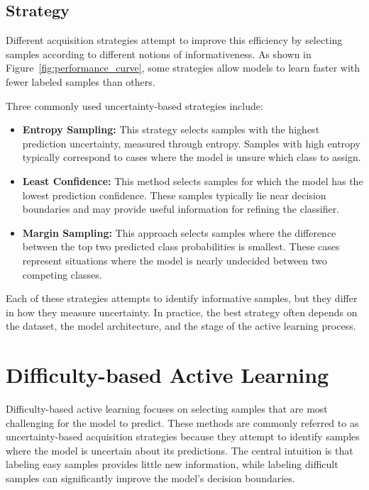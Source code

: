 \documentclass{article}
\begin{document}
\subsection{Strategy}

Different acquisition strategies attempt to improve this efficiency by selecting samples according to different notions of informativeness. As shown in Figure~\ref{fig:performance_curve}, some strategies allow models to learn faster with fewer labeled samples than others.

Three commonly used uncertainty-based strategies include:

\begin{itemize}

\item \textbf{Entropy Sampling:} This strategy selects samples with the highest prediction uncertainty, measured through entropy. Samples with high entropy typically correspond to cases where the model is unsure which class to assign.

\item \textbf{Least Confidence:} This method selects samples for which the model has the lowest prediction confidence. These samples typically lie near decision boundaries and may provide useful information for refining the classifier.

\item \textbf{Margin Sampling:} This approach selects samples where the difference between the top two predicted class probabilities is smallest. These cases represent situations where the model is nearly undecided between two competing classes.

\end{itemize}

Each of these strategies attempts to identify informative samples, but they differ in how they measure uncertainty. In practice, the best strategy often depends on the dataset, the model architecture, and the stage of the active learning process.


\section{Difficulty-based Active Learning}

Difficulty-based active learning focuses on selecting samples that are most challenging for the model to predict. These methods are commonly referred to as uncertainty-based acquisition strategies because they attempt to identify samples where the model is uncertain about its predictions. The central intuition is that labeling easy samples provides little new information, while labeling difficult samples can significantly improve the model's decision boundaries.
\end{document}
